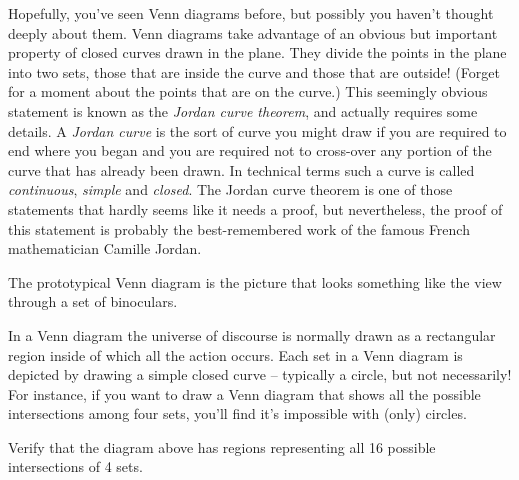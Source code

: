 Hopefully, you've seen 
Venn diagrams before, but possibly 
you haven't thought deeply about them.  Venn diagrams take 
advantage of an obvious but important property of closed 
curves drawn in the plane.  They divide the points in the
plane into two sets, those that are inside the curve and
those that are outside!  (Forget for a moment about the points
that are on the curve.)  This seemingly obvious statement
is known as the 
\emph{Jordan curve theorem}, and actually
requires some details.  A 
\emph{Jordan curve} is the sort 
of curve you might draw if you are required to end where
you began and you are required not to cross-over any portion 
of the curve that has already been drawn.  In technical
terms such a curve is called \emph{continuous}, \emph{simple} 
and \emph{closed}.
The Jordan curve theorem is one of those statements that hardly
seems like it needs a proof, but nevertheless, the proof of this
statement is probably the best-remembered work of the famous
French mathematician Camille Jordan.

The prototypical Venn diagram is the picture that looks something
like the view through a set of binoculars.

\vspace{.1in}



\vspace{.1in}

In a Venn diagram the 
universe of discourse is normally drawn as
a rectangular region inside of which all the action occurs.  Each
set in a Venn diagram is depicted by drawing a simple closed curve -- 
typically a circle, but not necessarily!  For instance, if you
want to draw a Venn diagram that shows all the possible intersections
among four sets, you'll find it's impossible with (only) circles.

\vspace{.1in}



\vspace{.1in}

\begin{exer}
Verify that the diagram above has regions representing all 16 possible
intersections of 4 sets.
\end{exer}

